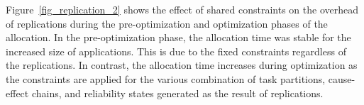 Figure~\ref{fig_replication_2} shows the effect of shared constraints on the overhead of replications during the pre-optimization and optimization phases of the allocation. In the pre-optimization phase, the allocation time was stable for the increased size of applications. This is due to the fixed constraints regardless of the replications. In contrast, the allocation time increases during optimization as the constraints are applied for the various combination of task partitions, cause-effect chains, and reliability states generated as the result of replications.

